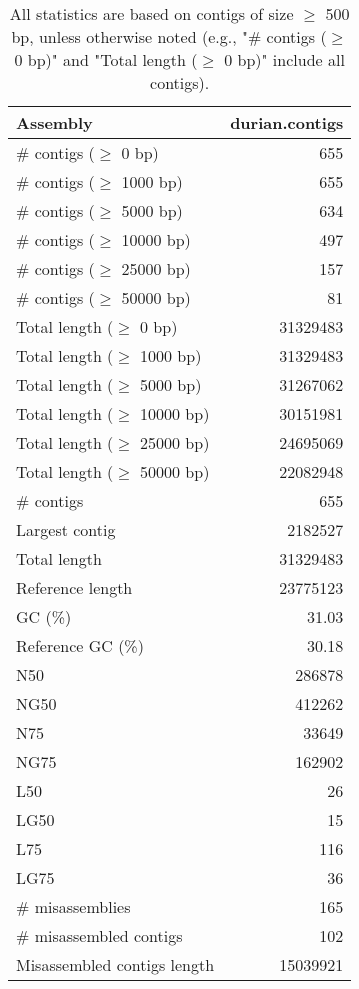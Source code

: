 \documentclass[12pt,a4paper]{article}
\begin{document}
\begin{table}[ht]
\begin{center}
\caption{All statistics are based on contigs of size $\geq$ 500 bp, unless otherwise noted (e.g., "\# contigs ($\geq$ 0 bp)" and "Total length ($\geq$ 0 bp)" include all contigs).}
\begin{tabular}{|l*{1}{|r}|}
\hline
Assembly & durian.contigs \\ \hline
\# contigs ($\geq$ 0 bp) & 655 \\ \hline
\# contigs ($\geq$ 1000 bp) & 655 \\ \hline
\# contigs ($\geq$ 5000 bp) & 634 \\ \hline
\# contigs ($\geq$ 10000 bp) & 497 \\ \hline
\# contigs ($\geq$ 25000 bp) & 157 \\ \hline
\# contigs ($\geq$ 50000 bp) & 81 \\ \hline
Total length ($\geq$ 0 bp) & 31329483 \\ \hline
Total length ($\geq$ 1000 bp) & 31329483 \\ \hline
Total length ($\geq$ 5000 bp) & 31267062 \\ \hline
Total length ($\geq$ 10000 bp) & 30151981 \\ \hline
Total length ($\geq$ 25000 bp) & 24695069 \\ \hline
Total length ($\geq$ 50000 bp) & 22082948 \\ \hline
\# contigs & 655 \\ \hline
Largest contig & 2182527 \\ \hline
Total length & 31329483 \\ \hline
Reference length & 23775123 \\ \hline
GC (\%) & 31.03 \\ \hline
Reference GC (\%) & 30.18 \\ \hline
N50 & 286878 \\ \hline
NG50 & 412262 \\ \hline
N75 & 33649 \\ \hline
NG75 & 162902 \\ \hline
L50 & 26 \\ \hline
LG50 & 15 \\ \hline
L75 & 116 \\ \hline
LG75 & 36 \\ \hline
\# misassemblies & 165 \\ \hline
\# misassembled contigs & 102 \\ \hline
Misassembled contigs length & 15039921 \\ \hline

\end{tabular}
\end{center}
\end{table}
\end{document}

